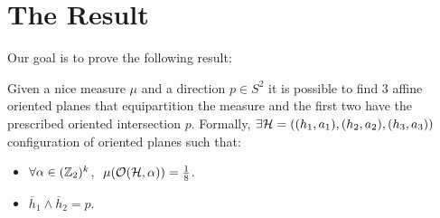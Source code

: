 \documentclass[10pt]{article}
\begin{document}
\section*{The Result}
Our goal is to prove the following result:
\begin{theorem}
  Given a nice measure $\mu$ and a direction $p\in S^2$ it is possible to find $3$ affine oriented planes that equipartition the measure and the
  first two have the prescribed oriented intersection $p$. Formally, $\exists \mathcal{H}=((h_1, a_1), (h_2, a_2), (h_3, a_3))$ configuration of oriented planes such that:
  \begin{itemize}
  \item $\forall \alpha\in (\mathbb{Z}_2)^k$, $\ \mu(\mathcal{O}(\mathcal{H}, \alpha))= \frac{1}{8}$.
  \item $\overline{h}_1\wedge \overline{h}_2 = p$.
  \end{itemize}
\end{theorem}
\end{document}
